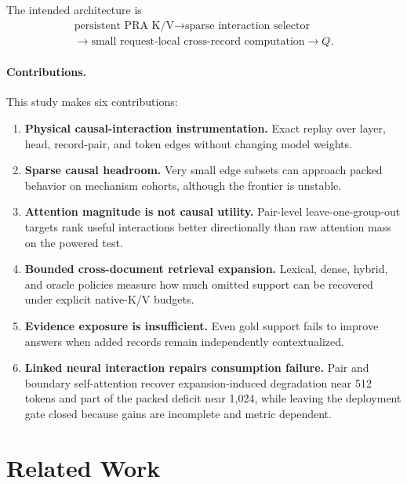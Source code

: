 \documentclass[11pt]{article}
\begin{document}
The intended architecture is
\[
\begin{gathered}
\text{persistent PRA K/V}
\rightarrow
\text{sparse interaction selector}\\
\rightarrow
\text{small request-local cross-record computation}
\rightarrow Q.
\end{gathered}
\]

\paragraph{Contributions.}
This study makes six contributions:
\begin{enumerate}[leftmargin=*]
    \item \textbf{Physical causal-interaction instrumentation.} Exact replay over
    layer, head, record-pair, and token edges without changing model weights.
    \item \textbf{Sparse causal headroom.} Very small edge subsets can approach
    packed behavior on mechanism cohorts, although the frontier is unstable.
    \item \textbf{Attention magnitude is not causal utility.} Pair-level
    leave-one-group-out targets rank useful interactions better directionally
    than raw attention mass on the powered test.
    \item \textbf{Bounded cross-document retrieval expansion.} Lexical, dense,
    hybrid, and oracle policies measure how much omitted support can be recovered
    under explicit native-K/V budgets.
    \item \textbf{Evidence exposure is insufficient.} Even gold support fails to
    improve answers when added records remain independently contextualized.
    \item \textbf{Linked neural interaction repairs consumption failure.}
    Pair and boundary self-attention recover expansion-induced degradation near
    512 tokens and part of the packed deficit near 1,024, while leaving the
    deployment gate closed because gains are incomplete and metric dependent.
\end{enumerate}

\section{Related Work}
\end{document}
